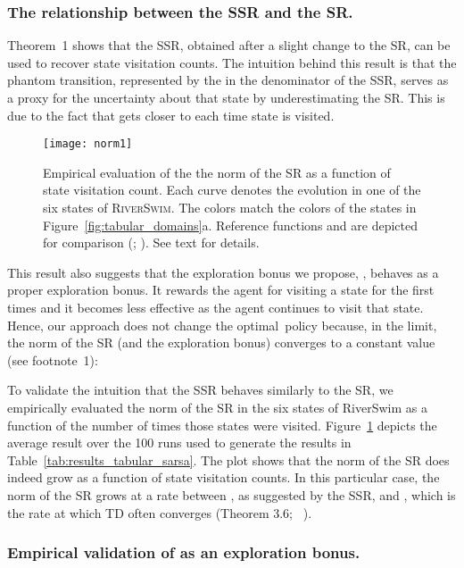 \documentclass[letterpaper]{article} \usepackage{aaai20}  \usepackage{times}  \usepackage{helvet} \usepackage{courier}  \usepackage[hyphens]{url}  \usepackage{graphicx} \urlstyle{rm} \def\UrlFont{\rm}  \usepackage{graphicx}  \frenchspacing  \setlength{\pdfpagewidth}{8.5in}  \setlength{\pdfpageheight}{11in}  \usepackage{booktabs}
\begin{document}
\subsubsection{The relationship between the SSR and the SR.}
Theorem~1 shows that the SSR, obtained after a slight change to the SR, can be used to recover state visitation counts. The intuition behind this result is that the phantom transition, represented by the  in the denominator of the SSR, serves as a proxy for the uncertainty about that state by underestimating the SR. This is due to the fact that  gets closer to  each time state  is visited.

\begin{figure}[t]
    \centering
    \texttt{[image: norm1]}
    \caption{Empirical evaluation of the the norm of the SR as a function of state visitation count. Each curve denotes the evolution in one of the six states of \textsc{RiverSwim}. The colors match the colors of the states in Figure~\ref{fig:tabular_domains}a. Reference functions  and  are depicted for comparison (; ). See text for details.}\label{fig:empirical_count}
\end{figure}

This result also suggests that the exploration bonus we propose, , behaves as a proper exploration bonus. It rewards the agent for visiting a state for the first times and it becomes less effective as the agent continues to visit that state. Hence, our approach does not change the optimal~policy because, in the limit, the norm of the SR (and the exploration bonus) converges to a constant value (see footnote~1):


To validate the intuition that the SSR behaves similarly to the SR, we empirically evaluated the norm of the SR in the six states of RiverSwim as a function of the number of times those states were visited. Figure~\ref{fig:empirical_count} depicts the average result over the 100 runs used to generate the results in Table~\ref{tab:results_tabular_sarsa}. The plot shows that the norm of the SR does indeed grow as a function of state visitation counts. In this particular case, the norm of the SR grows at a rate between , as suggested by the SSR, and , which is the rate at which TD often converges (Theorem 3.6; \citeauthor{Dalal18}~\citeyear{Dalal18}).

\subsubsection{Empirical validation of  as an exploration bonus.}
\end{document}
